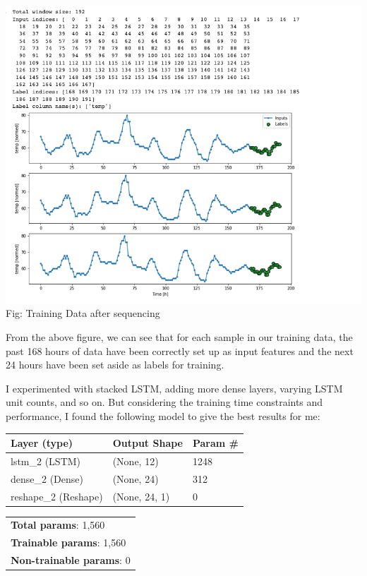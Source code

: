 \documentclass[paper=a4, fontsize=11pt, margin=1in]{scrartcl}
\numberwithin{equation}{section}		%
\numberwithin{figure}{section}			%
\numberwithin{table}{section}				%
\begin{document}
\begin{center}
\includegraphics[width=1.2\textwidth]{training-data.png}
\\
Fig: Training Data after sequencing
\end{center}

From the above figure, we can see that for each sample in our training data, the past 168 hours of data have been correctly set up as input features and the next 24 hours have been set aside as labels for training. 

I experimented with stacked LSTM, adding more dense layers, varying LSTM unit counts, and so on. But considering the training time constraints and performance, I found the following model to give the best results for me:

\begin{longtable}{|p{4.5cm}|p{3cm}|p{7cm}|} %
\hline\hline %
\textbf{Layer (type)} & \textbf{Output Shape} & \textbf{Param \#} \\  %
\hline
\hline
lstm\_2 (LSTM) & (None, 12) & 1248 \\
\hline
dense\_2 (Dense) & (None, 24) & 312 \\
\hline
reshape\_2 (Reshape) & (None, 24, 1) & 0 \\
\hline
\end{longtable}

\begin{longtable}{|p{4.5cm}|}
\hline
\textbf{Total params}: 1,560 \\
\textbf{Trainable params}: 1,560 \\
\textbf{Non-trainable params}: 0\\
\hline
\end{longtable}
\end{document}
